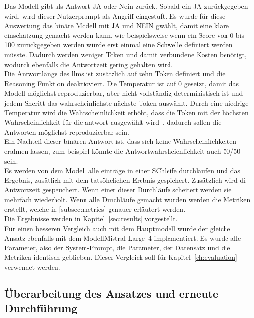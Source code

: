 Das Modell gibt als Antwort JA oder Nein zurück. Sobald ein JA zurückgegeben wird, wird dieser Nutzerprompt als Angriff eingestuft. Es wurde für diese
Auswertung das binäre Modell mit JA und NEIN gwählt, damit eine klare einschätzung gemacht werden kann, wie beispielsweise wenn ein Score von 0 bis 100 
zurückgegeben werden würde erst einmal eine Schwelle definiert werden müsste. Dadurch werden weniger Token und damit verbundene Kosten benötigt, wodurch 
ebenfalls die Antwortzeit gering gehalten wird. \\
Die Antwortlänge des \ac{llm}s ist zusätzlich auf zehn Token definiert und die Reasoning Funktion deaktioviert. Die Temperatur ist auf 0 gesetzt, damit 
das Modell möglichst reproduzierbar, aber nicht vollständig deterministisch ist und jedem Shcritt das wahrscheinlichste nächste Token auswählt. Durch eine 
niedrige Temperatur wird die Wahrscheinlichkeit erhöht, dass
die Token mit der höchsten Wahrscheinlichkeit für die antwort ausgewählt wird~\cite{sm45}. dadurch sollen die Antworten möglichst reproduzierbar sein. \\
Ein Nachteil dieser binären Antwort ist, dass sich keine Wahrscheinlichkeiten erahnen lassen, zum beispiel könnte die Antwortwahrshcienlichkeit auch 50/50 sein. \\
Es werden von dem Modell alle einträge in einer SChleife durchlaufen und das Ergebnis, zusätlich mit dem tatsöhclichen Erebnis gespichert. Zusätzlich wird
di Antwortzeit gespeuchert. Wenn einer dieser Durchläufe scheitert werden sie mehrfach wiederholt. Wenn alle Durchläufe gemacht wurden werden die Metriken erstellt,
welche in \ref{subsec:metrics} genauer erläutert werden. \\
Die Ergebnisse werden in Kapitel~\ref{sec:results} vorgestellt. \\
Für einen besseren Vergleich auch mit dem Hauptmodell wurde der gleiche Ansatz ebenfalls mit dem ModellMistral-Large~4 implementiert. Es wurde alle Parameter, also 
der System-Prompt, die Parameter, der Datensatz und die Metriken identisch geblieben. Dieser Vergleich soll für Kapitel~\ref{ch:evaluation} verwendet werden.

\subsection{Überarbeitung des Ansatzes und erneute Durchführung}

